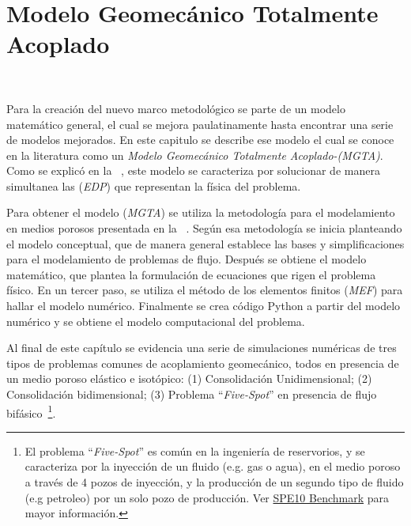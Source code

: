 %





\chapter{Modelo Geomecánico Totalmente Acoplado}~\hypertarget{chapter_03}{}
\label{ch:chapter_03}

Para la creación del nuevo marco metodológico se parte de un modelo matemático general, el cual se mejora paulatinamente hasta encontrar una serie de modelos mejorados. En este capitulo se describe ese modelo el cual se conoce en la literatura como un \textit{Modelo Geomecánico Totalmente Acoplado-(MGTA)}. Como se explicó en la ~, este modelo se caracteriza por solucionar de manera simultanea las (\textit{EDP}) que representan la física del problema.\bigskip

Para obtener el modelo (\textit{MGTA}) se utiliza la metodología para el modelamiento en medios porosos presentada en la ~. Según esa metodología se inicia planteando el modelo conceptual, que de manera general establece las bases y simplificaciones para el modelamiento de problemas de flujo. Después se obtiene el modelo matemático, que plantea la formulación de ecuaciones que rigen el problema físico. En un tercer paso, se utiliza el método de los elementos finitos (\textit{MEF}) para hallar el modelo numérico. Finalmente se crea código Python a partir del modelo numérico y se obtiene el modelo computacional del problema. \bigskip


Al final de este capítulo se evidencia una serie de simulaciones numéricas de tres tipos de problemas comunes de acoplamiento geomecánico, todos en presencia de un medio poroso elástico e isotópico: (1) Consolidación Unidimensional; (2) Consolidación bidimensional; (3) Problema “\textit{Five-Spot}” en presencia de flujo bifásico~\footnote{El problema “\textit{Five-Spot}” es común en la ingeniería de reservorios, y se caracteriza por la inyección de un fluido (e.g. gas o agua), en el medio poroso a través de 4 pozos de inyección, y la producción de un segundo tipo de fluido (e.g petroleo) por un solo pozo de producción. Ver \href{https://www.spe.org/web/csp/datasets/set02.htm}{SPE10 Benchmark} para mayor información.}.\bigskip

